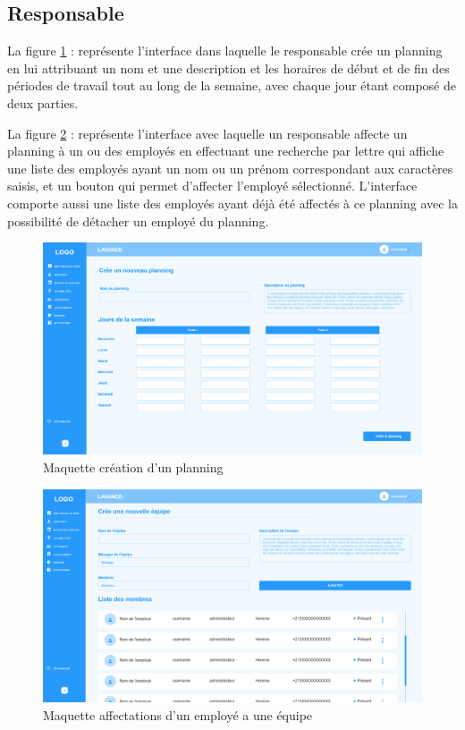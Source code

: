 \subsection{Responsable}
La figure \ref{fig10} : représente l’interface dans laquelle le responsable crée
un planning en lui attribuant un nom et une description et les horaires de début
et de fin des périodes de travail tout au long de la semaine, avec chaque jour
étant composé de deux parties.
 
La figure \ref{fig11} : représente l’interface avec laquelle un responsable
affecte un planning à un ou des employés en effectuant une recherche par lettre
qui affiche une liste des employés ayant un nom ou un prénom correspondant aux
caractères saisis, et un bouton qui permet d’affecter l’employé sélectionné.
L’interface comporte aussi une liste des employés ayant déjà été affectés à ce
planning avec la possibilité de détacher un employé du planning. 

\clearpage

\begin{figure}[h!]
    \centering
    \includegraphics[width=18cm]{images/add_panning.png}
    \caption{Maquette création d'un planning}
    \label{fig10}
\end{figure}



\begin{figure}[h!]
    \centering
    \includegraphics[width=18cm]{images/add_member.png}
    \caption{Maquette affectations d'un employé a une équipe }
    \label{fig11}
\end{figure}

